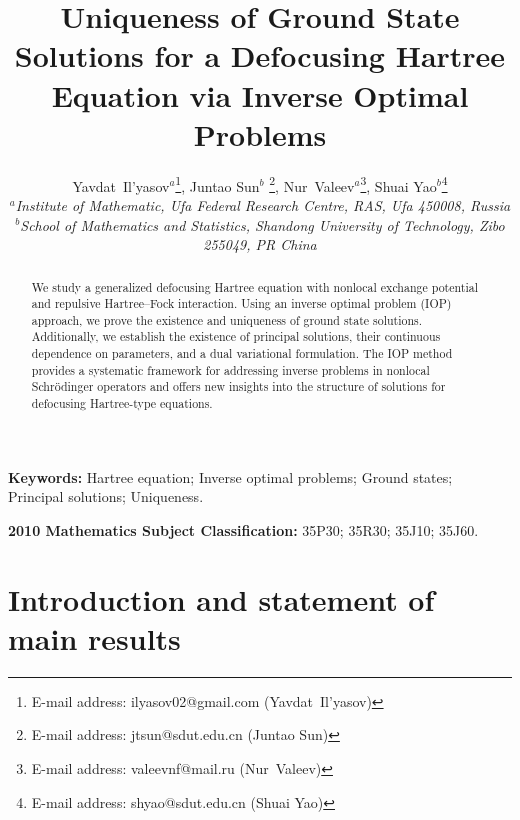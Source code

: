 \documentclass[12pt,thmsa]{article}
\begin{document}
\title{Uniqueness of Ground State Solutions for a Defocusing Hartree
Equation via Inverse Optimal Problems}
\date{}
\author{Yavdat~Il'yasov$^{a}$\thanks{%
E-mail address: ilyasov02@gmail.com (Yavdat~Il'yasov)}, Juntao Sun$^{b}$%
\thanks{%
E-mail address: jtsun@sdut.edu.cn (Juntao Sun)}, Nur~Valeev$^{a}$\thanks{%
E-mail address: valeevnf@mail.ru (Nur~Valeev)}, Shuai Yao$^{b}$\thanks{%
E-mail address: shyao@sdut.edu.cn (Shuai Yao)} \\
$^{a}${\footnotesize \emph{Institute of Mathematic, Ufa Federal Research
Centre, RAS, Ufa 450008, Russia}}\\
$^{b}${\footnotesize \emph{School of Mathematics and Statistics, Shandong
University of Technology, Zibo 255049, PR China}}}
\maketitle

\begin{abstract}
We study a generalized defocusing Hartree equation with nonlocal exchange
potential and repulsive Hartree--Fock interaction. Using an inverse optimal
problem (IOP) approach, we prove the existence and uniqueness of ground
state solutions. Additionally, we establish the existence of principal
solutions, their continuous dependence on parameters, and a dual variational
formulation. The IOP method provides a systematic framework for addressing
inverse problems in nonlocal Schr\"{o}dinger operators and offers new
insights into the structure of solutions for defocusing Hartree-type
equations.
\end{abstract}

\textbf{Keywords:} Hartree equation; Inverse optimal problems; Ground
states; Principal solutions; Uniqueness.

\textbf{2010 Mathematics Subject Classification:} 35P30; 35R30; 35J10; 35J60.

\section{Introduction and statement of main results}
\end{document}
